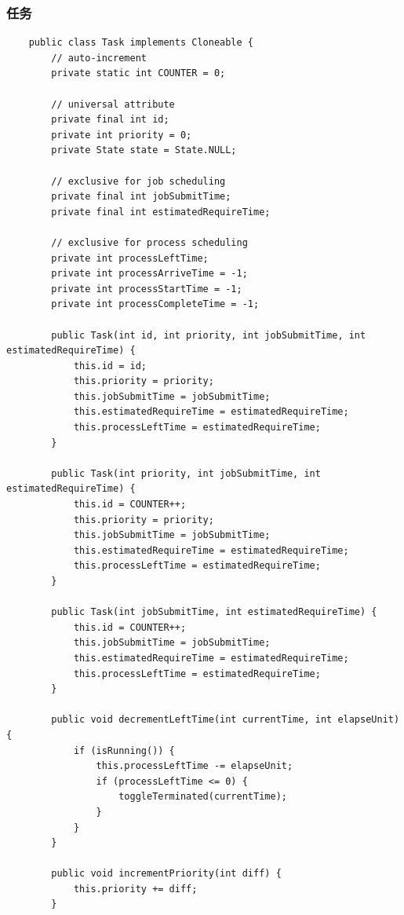 \documentclass[12pt, a4paper, UTF8]{ctexart}
\begin{document}
\subsubsection{任务}
\begin{verbatim}
    public class Task implements Cloneable {
        // auto-increment
        private static int COUNTER = 0;
    
        // universal attribute
        private final int id;
        private int priority = 0;
        private State state = State.NULL;
    
        // exclusive for job scheduling
        private final int jobSubmitTime;
        private final int estimatedRequireTime;
    
        // exclusive for process scheduling
        private int processLeftTime;
        private int processArriveTime = -1;
        private int processStartTime = -1;
        private int processCompleteTime = -1;
    
        public Task(int id, int priority, int jobSubmitTime, int estimatedRequireTime) {
            this.id = id;
            this.priority = priority;
            this.jobSubmitTime = jobSubmitTime;
            this.estimatedRequireTime = estimatedRequireTime;
            this.processLeftTime = estimatedRequireTime;
        }
    
        public Task(int priority, int jobSubmitTime, int estimatedRequireTime) {
            this.id = COUNTER++;
            this.priority = priority;
            this.jobSubmitTime = jobSubmitTime;
            this.estimatedRequireTime = estimatedRequireTime;
            this.processLeftTime = estimatedRequireTime;
        }
    
        public Task(int jobSubmitTime, int estimatedRequireTime) {
            this.id = COUNTER++;
            this.jobSubmitTime = jobSubmitTime;
            this.estimatedRequireTime = estimatedRequireTime;
            this.processLeftTime = estimatedRequireTime;
        }
    
        public void decrementLeftTime(int currentTime, int elapseUnit) {
            if (isRunning()) {
                this.processLeftTime -= elapseUnit;
                if (processLeftTime <= 0) {
                    toggleTerminated(currentTime);
                }
            }
        }
    
        public void incrementPriority(int diff) {
            this.priority += diff;
        }
    

\end{verbatim}
\end{document}
